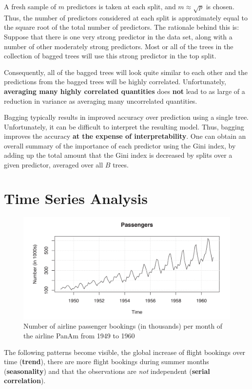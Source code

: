 \documentclass[11pt]{article}
\begin{document}
A fresh sample of $m$ predictors is taken at each split, and $m\approx \sqrt{p}$ is chosen. Thus, the number of predictors considered at each split is approximately equal to the square root of the total number of predictors. The rationale behind this is: Suppose that there is one very strong predictor in the data set, along with a number of other moderately strong predictors. Most or all of the trees in the collection of bagged trees will use this strong predictor in the top split. 

Consequently, all of the bagged trees will look quite similar to each other and the predictions from the bagged trees will be highly correlated. Unfortunately, \textbf{averaging many highly correlated quantities} does \textbf{not} lead to as large of a reduction in variance as averaging many uncorrelated quantities.

Bagging typically results in improved accuracy over prediction using a single tree. Unfortunately, it can be difficult to interpret the resulting model. Thus, bagging improves the accuracy \textbf{at the expense of interpretability}. One can obtain an overall summary of the importance of each predictor using the Gini index, by adding up the total amount that the Gini index is decreased by splits over a given predictor, averaged over all $B$ trees.

\section{Time Series Analysis}

\begin{figure}[H]
	\centering
	\includegraphics[width=0.7\linewidth]{img/time_series_plot}
	\caption{Number of airline passenger bookings (in thousands) per month of the airline PanAm from 1949 to 1960}
	\label{fig:timeseriesplot}
\end{figure}
The following patterns become visible, the global increase of flight bookings over time (\textbf{trend}), there are more flight bookings during summer months (\textbf{seasonality}) and that the observations are \emph{not} independent (\textbf{serial correlation}).
\end{document}
